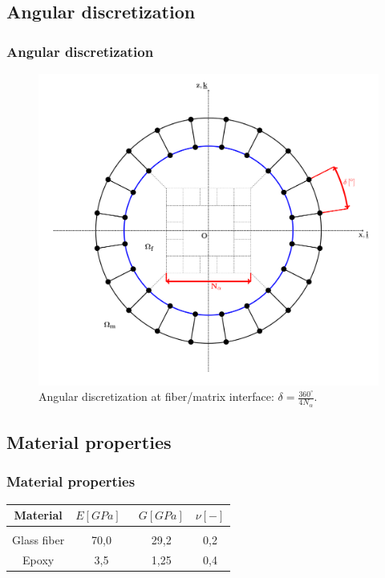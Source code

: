 \documentclass[first,firstsupp,lastsupp,handout,last,hyperref,table]{ETHclass}
\begin{document}
\subsection{Angular discretization}

\begin{frame}
\frametitle{\small Angular discretization}
\vspace{-0.7cm}
\centering
\captionsetup[figure]{font=scriptsize,labelfont=scriptsize}
\begin{figure}[!h]
\centering
\includegraphics[height=0.7\textheight]{mesh-disc-at-interface.pdf}
  \caption{\scriptsize Angular discretization at fiber/matrix interface: $\delta=\frac{360^{\circ}}{4N_{\alpha}}$.}
  \label{fig:angu-discr-def}
\end{figure}
\end{frame}

\subsection{Material properties}

\begin{frame}
\frametitle{\small Material properties}
\vspace{-0.7cm}
\footnotesize
\centering
\captionsetup[figure]{font=scriptsize,labelfont=scriptsize}
\begin{table}[htbp]

  \centering
    \begin{tabular}{cccc}

    \textbf{Material} & \textbf{$E\left[GPa\right]$}\ & \textbf{$G\left[GPa\right]$} & \textbf{$\nu\left[-\right]$} \\[3pt]
    \midrule\\[12pt]
    Glass fiber    & 70,0  & 29,2   & 0,2  \\[16pt]
    Epoxy    & 3,5    & 1,25   & 0,4  

    \end{tabular}%
  \label{tab:phaseprop}%
\end{table}%
\end{frame}
\end{document}
